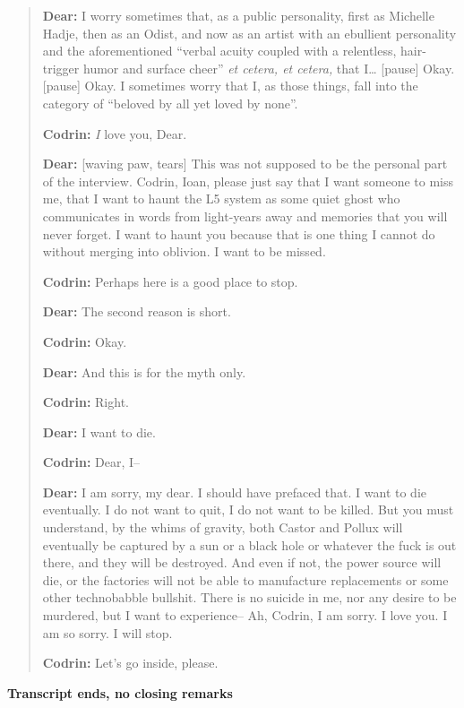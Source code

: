 \begin{quote}
\textbf{Dear:} I worry sometimes that, as a public personality, first as Michelle Hadje, then as an Odist, and now as an artist with an ebullient personality and the aforementioned ``verbal acuity coupled with a relentless, hair-trigger humor and surface cheer'' \emph{et cetera, et cetera,} that I\ldots{} {[}pause{]} Okay. {[}pause{]} Okay. I sometimes worry that I, as those things, fall into the category of ``beloved by all yet loved by none''.

\textbf{Codrin:} \emph{I} love you, Dear.

\textbf{Dear:} {[}waving paw, tears{]} This was not supposed to be the personal part of the interview. Codrin, Ioan, please just say that I want someone to miss me, that I want to haunt the L5 system as some quiet ghost who communicates in words from light-years away and memories that you will never forget. I want to haunt you because that is one thing I cannot do without merging into oblivion. I want to be missed.

\textbf{Codrin:} Perhaps here is a good place to stop.

\textbf{Dear:} The second reason is short.

\textbf{Codrin:} Okay.

\textbf{Dear:} And this is for the myth only.

\textbf{Codrin:} Right.

\textbf{Dear:} I want to die.

\textbf{Codrin:} Dear, I--

\textbf{Dear:} I am sorry, my dear. I should have prefaced that. I want to die eventually. I do not want to quit, I do not want to be killed. But you must understand, by the whims of gravity, both Castor and Pollux will eventually be captured by a sun or a black hole or whatever the fuck is out there, and they will be destroyed. And even if not, the power source will die, or the factories will not be able to manufacture replacements or some other technobabble bullshit. There is no suicide in me, nor any desire to be murdered, but I want to experience-- Ah, Codrin, I am sorry. I love you. I am so sorry. I will stop.

\textbf{Codrin:} Let's go inside, please.
\end{quote}

\textbf{Transcript ends, no closing remarks}
